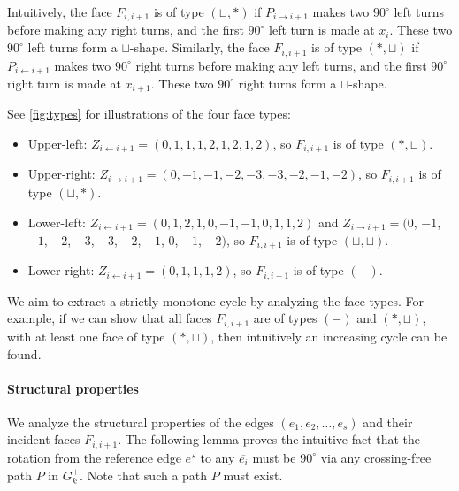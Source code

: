 \documentclass{theoretics}
\newcommand{\Nsouth}{\mathcal{N}_\mathsf{south}}
\newcommand{\eref}{e^\star}
\begin{document}



Intuitively, the face $F_{i,i+1}$ is of type $(\sqcup, \ast)$ if $P_{i \rightarrow i+1}$ makes two $90^\circ$ left turns before making any right turns, and the first $90^\circ$ left turn is made at $x_{i}$. These two $90^\circ$ left turns form a $\sqcup$-shape.
Similarly, the face $F_{i,i+1}$ is of type $(\ast, \sqcup)$ if ${P_{i \leftarrow i+1}}$ makes two $90^\circ$ right turns before making any left turns, and the first $90^\circ$ right turn is made at $x_{i+1}$.  These two $90^\circ$ right turns form a $\sqcup$-shape.


See \cref{fig:types} for illustrations of the four face types:
\begin{itemize}
    \item Upper-left: $Z_{i\leftarrow i+1}=(0,1,1,1,2,1,2,1,2)$, so $F_{i,i+1}$ is of type $(\ast,\sqcup)$.  
    \item Upper-right: $Z_{i\rightarrow i+1}=(0,-1,-1,-2,-3,-3,-2,-1,-2)$, so $F_{i,i+1}$ is of type $(\sqcup,\ast)$. 
    \item Lower-left: $Z_{i\leftarrow i+1}=(0,1,2,1,0,-1,-1,0,1,1,2)$ and $Z_{i\rightarrow i+1}=(0$, $-1$, $-1$, $-2$, $-3$, $-3$, $-2$, $-1$, $0$, $-1$, $-2)$, so $F_{i,i+1}$ is of type $(\sqcup,\sqcup)$.  
    \item Lower-right: $Z_{i\leftarrow i+1}=(0,1,1,1,2)$, so $F_{i,i+1}$ is of type $(-)$. 
\end{itemize}

We aim to extract a strictly monotone cycle by analyzing the face types. For example, if we can show that all faces $F_{i,i+1}$ are of types $(-)$ and $(\ast,\sqcup)$, with at least one face of type $(\ast,\sqcup)$, then intuitively an increasing cycle can be found.


\paragraph{Structural properties}
We analyze the structural properties of the edges $(e_1, e_2, \ldots, e_s)$ and their incident faces $F_{i,i+1}$. The following lemma proves the intuitive fact that the rotation from the reference edge $\eref$ to any $\overline{e_i}$ must be $90^\circ$ via any crossing-free path $P$ in $G_k^+$.
Note that such a path $P$ must exist.
\end{document}

